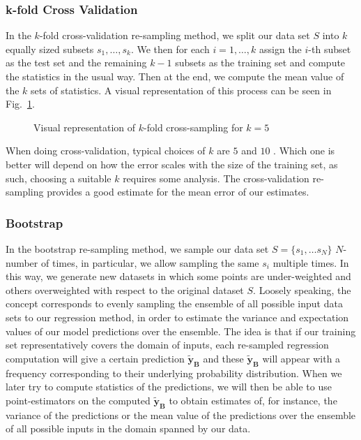 \documentclass[reprint, english, nofootinbib]{revtex4-2}
\begin{document}
        \subsubsection{k-fold Cross Validation}
            \noindent
            In the $k$-fold cross-validation re-sampling method, we split our data set $S$ into $k$ equally sized subsets $s_1, \dots, s_k$.
            We then for each $i = 1,\dots, k$ assign the $i$-th subset as the test set and the remaining $k-1$ subsets as the training set and compute the statistics in the usual way. Then at the end, we compute the mean value of the $k$ sets of statistics. A visual representation of this process can be seen in Fig.~\ref{fig: Cross Validation}.
            \begin{figure}[h!tb]
                \center
                \vspace{5mm} %
                
                \caption{\label{fig: Cross Validation}Visual representation of $k$-fold cross-sampling for $k=5$}
            \end{figure}
            When doing cross-validation, typical choices of $k$ are $5$ and $10$ \cite{hastie}. Which one is better will depend on how the error scales with the size of the training set, as such, choosing a suitable $k$ requires some analysis.
            The cross-validation re-sampling provides a good estimate for the mean error of our estimates.

        \subsubsection{Bootstrap}
            \noindent
            In the bootstrap re-sampling method, we sample our data set $S = \{s_1, \dots s_N\}$ $N$-number of times, in particular, we allow sampling the same $s_i$ multiple times. In this way, we generate new datasets in which some points are under-weighted and others overweighted with respect to the original dataset $S$. Loosely speaking, the concept corresponds to evenly sampling the ensemble of all possible input data sets to our regression method, in order to estimate the variance and expectation values of our model predictions over the ensemble. The idea is that if our training set representatively covers the domain of inputs, each re-sampled regression computation will give a certain prediction $\pmb{\tilde{y}_{B}}$ and these $\pmb{\tilde{y}_{B}}$ will appear with a frequency corresponding to their  underlying probability distribution. When we later try to compute statistics of the predictions, we will then be able to use point-estimators on the computed $\pmb{\tilde{y}_{B}}$ to obtain estimates of, for instance, the variance of the predictions or the mean value of the predictions over the ensemble of all possible inputs in the domain spanned by our data.
\end{document}
